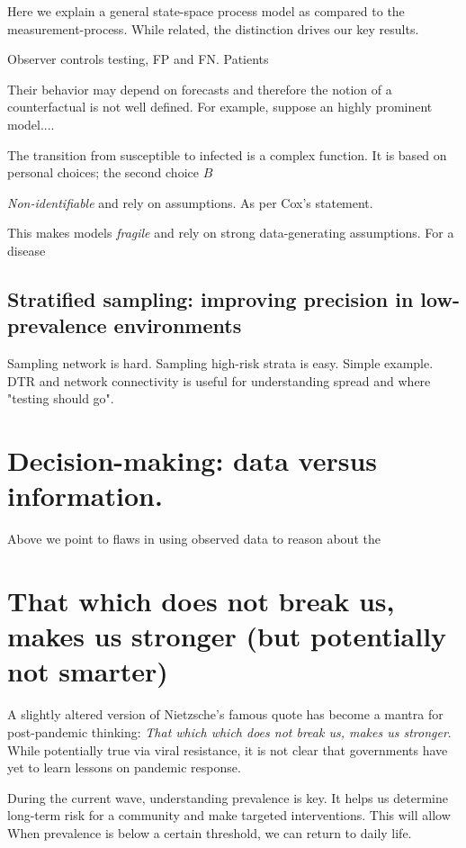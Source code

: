 \documentclass[11pt]{article}
\numberwithin{equation}{section}
\theoremstyle{plain}
\begin{document}
Here we explain a general state-space process model as compared to the measurement-process.  While related, the distinction drives our key results.

Observer controls testing, FP and FN.  Patients

Their behavior may depend on forecasts and therefore the notion of a counterfactual is not well defined.  For example, suppose an highly prominent model....

The transition from susceptible to infected is a complex function.  It is based on personal choices;  the second choice
$B$

\emph{Non-identifiable} and rely on assumptions.  As per Cox's statement.

This makes models \emph{fragile} and rely on strong data-generating assumptions.  For a disease

\subsection{Stratified sampling: improving precision in low-prevalence environments}

Sampling network is hard.  Sampling high-risk strata is easy.  Simple example.
DTR and network connectivity is useful for understanding spread and where "testing should go".

\section{Decision-making: data versus information.}

Above we point to flaws in using observed data to reason about the

\section{That which does not break us, makes us stronger (but potentially not smarter)}

A slightly altered version of Nietzsche's famous quote has become a mantra for post-pandemic thinking: \emph{That which which does not break us, makes us stronger}.  While potentially true via viral resistance, it is not clear that governments have yet to learn lessons on pandemic response.

During the current wave, understanding prevalence is key.  It helps us determine long-term risk for a community and make targeted interventions.  This will allow
When prevalence is below a certain threshold, we can return to daily life.
\end{document}
